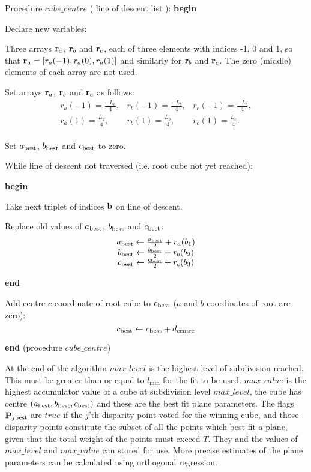     Procedure $cube\_centre$ ( line of descent list ):
    {\bf begin}
    \begin{indent_para}
     Declare new variables:
     \begin{indent_para}
      Three arrays ${\bf r}_a$, ${\bf r}_b$ and ${\bf r}_c$, each of three
      elements with indices -1, 0 and 1, so that
      ${\bf r}_a = [r_a(-1),r_a(0),r_a(1)]$ and similarly for ${\bf r}_b$
      and ${\bf r}_c$. The zero (middle) elements of each array are not used.
     \end{indent_para}
     Set arrays ${\bf r}_a$, ${\bf r}_b$ and ${\bf r}_c$ as follows:
     \[
	 \begin{array}{ccc}
	  r_a(-1) = \frac{-L_a}{4}, & r_b(-1) = \frac{-L_b}{4}, &
	  r_c(-1) = \frac{-L_c}{4}, \\
	  r_a(1) = \frac{L_a}{4}, & r_b(1) = \frac{L_b}{4}, &
	  r_c(1) = \frac{L_c}{4}. \\
	 \end{array}
     \]

     Set $a_{\rm best}$, $b_{\rm best}$ and $c_{\rm best}$ to zero.

     While line of descent not traversed (i.e. root cube not yet reached):

     {\bf begin}
     \begin{indent_para}
      Take next triplet of indices ${\bf b}$ on line of descent.

      Replace old values of $a_{\rm best}$, $b_{\rm best}$ and $c_{\rm best}$:
      \[
	  \begin{array}{c}
	   a_{\rm best} \leftarrow \frac{a_{\rm best}}{2} + r_a(b_1) \\
	   b_{\rm best} \leftarrow \frac{b_{\rm best}}{2} + r_b(b_2) \\
	   c_{\rm best} \leftarrow \frac{c_{\rm best}}{2} + r_c(b_3) \\
	  \end{array}
      \]
     \end{indent_para}
     {\bf end}

     Add centre $c$-coordinate of root cube to $c_{\rm best}$ ($a$ and $b$
     coordinates of root are zero):
     \[ c_{\rm best} \leftarrow c_{\rm best} + d_{\rm centre} \]
    \end{indent_para}
  {\bf end} (procedure $cube\_centre$)

  At the end of the algorithm $max\_level$ is the highest level
  of subdivision
  reached. This must be greater than or equal to $l_{\min}$ for the fit
  to be used. $max\_value$ is the highest accumulator value of a
  cube at subdivision level $max\_level$, the cube has centre
  $(a_{\rm best} , b_{\rm best} , c_{\rm best} )$
  and these are the best fit plane parameters.
  The flags ${\bf P}_{j \rm best}$ are $true$ if the $j$'th disparity
  point voted for the winning cube,
  and those disparity points constitute the subset of all the points which
  best fit a plane, given that the total weight of the points must
  exceed $T$. They and the values of $max\_level$ and $max\_value$ can
  stored for use. More precise estimates of the plane
  parameters can be calculated using orthogonal regression.

